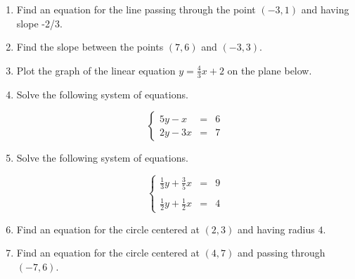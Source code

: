 \documentclass{article}
\begin{document}
\ActivityTitle[class={College Algebra}, number={1}, name={Lines and Circles}]

\begin{enumerate}
\item Find an equation for the line passing through the point $(-3, 1)$ and having slope -2/3. \vspace{5cm}

\item Find the slope between the points $(7, 6)$ and $(-3, 3)$. \vspace{5cm}

\item Plot the graph of the linear equation $y = \frac{4}{3} x + 2$ on the plane below.\begin{center}
\CartesianPlane[h=7,w=7,axes=yes]
\end{center}

  

\newpage

\item Solve the following system of equations.

\[ \left\{ \begin{array}{rcl} 5y - x & = & 6 \\ 2y - 3x & = & 7 \end{array} \right. \] \vspace{5cm}

\item Solve the following system of equations.

\[ \left\{ \begin{array}{rcl} \frac{1}{3}y + \frac{3}{5}x & = & 9 \\ & & \\ \frac{1}{2}y + \frac{1}{2}x & = & 4 \end{array} \right. \] \vspace{5cm}

\item Find an equation for the circle centered at $(2, 3)$ and having radius $4$. \vspace{2cm}

\item Find an equation for the circle centered at $(4, 7)$ and passing through $(-7, 6)$. \vspace{5cm}
\end{enumerate}
\end{document}
